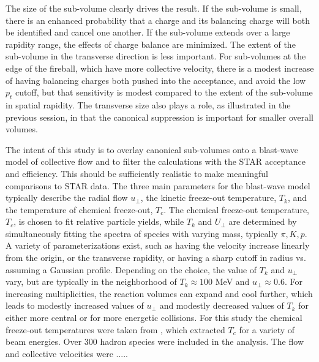 The size of the sub-volume clearly drives the result. If the sub-volume is small, there is an enhanced probability that a charge and its balancing charge will both be identified and cancel one another. If the sub-volume extends over a large rapidity range, the effects of charge balance are minimized. The extent of the sub-volume in the transverse direction is less important. For sub-volumes at the edge of the fireball, which have more collective velocity, there is a modest increase of having balancing charges both pushed into the acceptance, and avoid the low $p_t$ cutoff, but that sensitivity is modest compared to the extent of the sub-volume in spatial rapidity. The transverse size also plays a role, as illustrated in the previous session, in that the canonical suppression is important for smaller overall volumes. 

The intent of this study is to overlay canonical sub-volumes onto a blast-wave model of collective flow and to filter the calculations with the STAR acceptance and efficiency. This should be sufficiently realistic to make meaningful comparisons to STAR data. The three main parameters for the blast-wave model typically describe the radial flow $u_\perp$, the kinetic freeze-out temperature, $T_k$, and the temperature of chemical freeze-out, $T_c$. The chemical freeze-out temperature, $T_c$, is chosen to fit relative particle yields, while $T_k$ and $U_\perp$ are determined by simultaneously fitting the spectra of species with varying mass, typically $\pi,K,p$. A variety of parameterizations exist, such as having the velocity increase linearly from the origin, or the transverse rapidity, or having a sharp cutoff in radius vs. assuming a Gaussian profile. Depending on the choice, the value of $T_k$ and $u_\perp$ vary, but are typically in the neighborhood of $T_k\approx 100$ MeV and $u_\perp\approx 0.6$. For increasing multiplicities, the reaction volumes can expand and cool further, which leads to modestly increased values of $u_\perp$ and modestly decreased values of $T_k$ for either more central or for more energetic collisions. For this study the chemical freeze-out temperatures were taken from \cite{}, which extracted $T_c$ for a variety of beam energies. Over 300 hadron species were included in the analysis. The flow and collective velocities were .....

